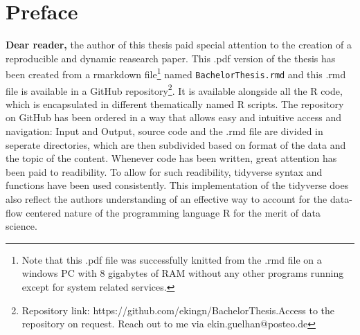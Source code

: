 \documentclass[
  12pt,
]{article}
\begin{document}
\newpage

\begingroup
\centering
\raggedright
\tableofcontents
\endgroup

\cleardoublepage
{}

\newpage

\hypertarget{preface}{%
\section{Preface}\label{preface}}

\begin{Center}
\begin{justify}
\normalsize
\textbf{Dear reader,}\newline
the author of this thesis paid special attention to the creation of a reproducible and dynamic reasearch paper. This .pdf version of the thesis has been created from a rmarkdown file\footnote{Note that this .pdf file was successfully knitted from the .rmd file on a windows PC with 8 gigabytes of RAM without any other programs running except for system related services.} named \texttt{BachelorThesis.rmd} and this .rmd file is available in a GitHub repository\footnote{Repository link: https://github.com/ekingn/BachelorThesis.\newline Access to the repository on request. Reach out to me via ekin.guelhan@posteo.de}. It is available alongside all the R code, which is encapsulated in different thematically named R scripts. The repository on GitHub has been ordered in a way that allows easy and intuitive access and navigation: Input and Output, source code and the .rmd file are divided in seperate directories, which are then subdivided based on format of the data and the topic of the content. Whenever code has been written, great attention has been paid to readibility. To allow for such readibility, tidyverse syntax and functions have been used consistently. This implementation of the tidyverse does also reflect the authors understanding of an effective way to account for the data-flow centered nature of the programming language R for the merit of data science.\newline

\end{justify}
\end{Center}
\end{document}
